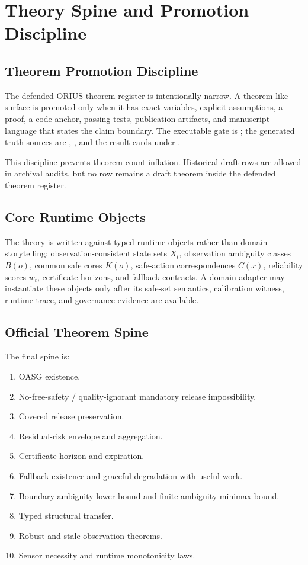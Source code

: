 \chapter{Theory Spine and Promotion Discipline}
\label{ch:theory-spine}

\section{Theorem Promotion Discipline}
The defended ORIUS theorem register is intentionally narrow.  A theorem-like
surface is promoted only when it has exact variables, explicit assumptions, a
proof, a code anchor, passing tests, publication artifacts, and manuscript
language that states the claim boundary.  The executable gate is
; the generated truth sources are
,
, and the result cards
under .

This discipline prevents theorem-count inflation.  Historical draft rows are
allowed in archival audits, but no row remains a draft theorem inside the
defended theorem register.

\section{Core Runtime Objects}
The theory is written against typed runtime objects rather than domain
storytelling: observation-consistent state sets \(X_t\), observation ambiguity
classes \(B(o)\), common safe cores \(K(o)\), safe-action correspondences
\(C(x)\), reliability scores \(w_t\), certificate horizons, and fallback
contracts.  A domain adapter may instantiate these objects only after its
safe-set semantics, calibration witness, runtime trace, and governance evidence
are available.

\section{Official Theorem Spine}
The final spine is:
\begin{enumerate}
  \item OASG existence.
  \item No-free-safety / quality-ignorant mandatory release impossibility.
  \item Covered release preservation.
  \item Residual-risk envelope and aggregation.
  \item Certificate horizon and expiration.
  \item Fallback existence and graceful degradation with useful work.
  \item Boundary ambiguity lower bound and finite ambiguity minimax bound.
  \item Typed structural transfer.
  \item Robust and stale observation theorems.
  \item Sensor necessity and runtime monotonicity laws.
\end{enumerate}

